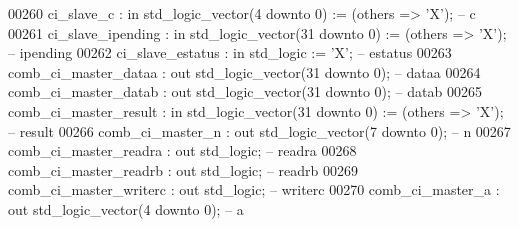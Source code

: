 \begin{DoxyCode}
00260             ci\_slave\_c                : \textcolor{keywordflow}{in}  \textcolor{comment}{std\_logic\_vector}(\textcolor{vhdllogic}{}\textcolor{vhdllogic}{4} \textcolor{keywordflow}{downto} \textcolor{vhdllogic}{}\textcolor{vhdllogic}{0})  := (\textcolor{keywordflow}{others} => 'X'); \textcolor{keyword}{-- c}
00261             ci\_slave\_ipending         : \textcolor{keywordflow}{in}  \textcolor{comment}{std\_logic\_vector}(\textcolor{vhdllogic}{}\textcolor{vhdllogic}{31} \textcolor{keywordflow}{downto} \textcolor{vhdllogic}{}\textcolor{vhdllogic}{0}) := (\textcolor{keywordflow}{others} => 'X'); \textcolor{keyword}{-- ipending}
00262             ci\_slave\_estatus          : \textcolor{keywordflow}{in}  \textcolor{comment}{std\_logic}                     := 'X';             \textcolor{keyword}{-- estatus}
00263             comb\_ci\_master\_dataa      : \textcolor{keywordflow}{out} \textcolor{comment}{std\_logic\_vector}(\textcolor{vhdllogic}{}\textcolor{vhdllogic}{31} \textcolor{keywordflow}{downto} \textcolor{vhdllogic}{}\textcolor{vhdllogic}{0});                    \textcolor{keyword}{-- dataa}
00264             comb\_ci\_master\_datab      : \textcolor{keywordflow}{out} \textcolor{comment}{std\_logic\_vector}(\textcolor{vhdllogic}{}\textcolor{vhdllogic}{31} \textcolor{keywordflow}{downto} \textcolor{vhdllogic}{}\textcolor{vhdllogic}{0});                    \textcolor{keyword}{-- datab}
00265             comb\_ci\_master\_result     : \textcolor{keywordflow}{in}  \textcolor{comment}{std\_logic\_vector}(\textcolor{vhdllogic}{}\textcolor{vhdllogic}{31} \textcolor{keywordflow}{downto} \textcolor{vhdllogic}{}\textcolor{vhdllogic}{0}) := (\textcolor{keywordflow}{others} => 'X'); \textcolor{keyword}{-- result}
00266             comb\_ci\_master\_n          : \textcolor{keywordflow}{out} \textcolor{comment}{std\_logic\_vector}(\textcolor{vhdllogic}{}\textcolor{vhdllogic}{7} \textcolor{keywordflow}{downto} \textcolor{vhdllogic}{}\textcolor{vhdllogic}{0});                     \textcolor{keyword}{-- n}
00267             comb\_ci\_master\_readra     : \textcolor{keywordflow}{out} \textcolor{comment}{std\_logic};                                        \textcolor{keyword}{-- readra}
00268             comb\_ci\_master\_readrb     : \textcolor{keywordflow}{out} \textcolor{comment}{std\_logic};                                        \textcolor{keyword}{-- readrb}
00269             comb\_ci\_master\_writerc    : \textcolor{keywordflow}{out} \textcolor{comment}{std\_logic};                                        \textcolor{keyword}{-- writerc}
00270             comb\_ci\_master\_a          : \textcolor{keywordflow}{out} \textcolor{comment}{std\_logic\_vector}(\textcolor{vhdllogic}{}\textcolor{vhdllogic}{4} \textcolor{keywordflow}{downto} \textcolor{vhdllogic}{}\textcolor{vhdllogic}{0});                     \textcolor{keyword}{-- a}

\end{DoxyCode}
